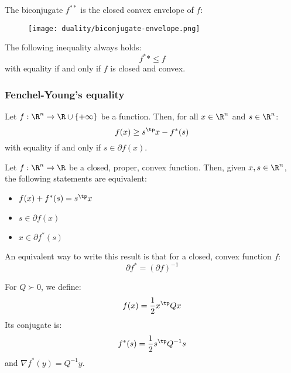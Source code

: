 \begin{property}
    The biconjugate $f^{**}$ is the closed convex envelope of $f$:
    \begin{figure}[H]
        \centering
        \texttt{[image: duality/biconjugate-envelope.png]}
    \end{figure}
\end{property}
\begin{property}
    The following inequality always holds:
    \begin{equation*}
        f^**\leq f
    \end{equation*}
    with equality if and only if $f$ is closed and convex.
\end{property}

\subsubsection{Fenchel-Young's equality}
\begin{theorem}
    Let $f:\R^n\to\R\cup\{+\infty\}$ be a function. Then, for all $x\in\R^n$ and $s\in\R^n$:
    \begin{equation}
        \label{eq:fenchel-young-in}
        f(x) \geq s^\tp x - f^*(s)
    \end{equation}
    with equality if and only if $s\in\partial f(x)$.
\end{theorem}

\begin{theorem}
    Let $f:\R^n\to\R$ be a closed, proper, convex function. Then, given $x, s\in\R^n$, the following statements are equivalent:
    \begin{itemize}
        \item $f(x)+f^*(s)=s^\tp x$
        \item $s\in\partial f(x)$
        \item $x\in\partial f^*(s)$
    \end{itemize}
    An equivalent way to write this result is that for a closed, convex function $f$:
    \begin{equation}
        \partial f^* = (\partial f)^{-1}
    \end{equation}
\end{theorem}

\begin{example}
    For $Q\succ 0$, we define:
    \begin{equation*}
        f(x) = \frac{1}{2}x^\tp Qx
    \end{equation*}
    Its conjugate is:
    \begin{equation*}
        f^*(s) = \frac{1}{2}s^\tp Q^{-1}s
    \end{equation*}
    and $\nabla f^*(y) = Q^{-1}y$.
\end{example}

